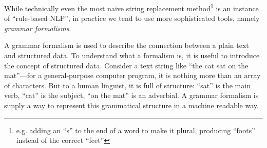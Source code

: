 While technically even the most naive string replacement method\footnote{e.g. adding an ``s'' to the end of a word to make it plural, producing ``foots'' instead of the correct ``feet''} is an instance of ``rule-based NLP'', in practice we tend to use more sophisticated tools, namely \emph{grammar formalisms}.

% 
% 
% 
% 
% 

A grammar formalism is used to describe the connection between a plain text and structured data. To understand what a formalism is, it is useful to introduce the concept of structured data. Consider a text string like ``the cat sat on the mat''—for a general-purpose computer program, it is nothing more than an array of characters. But to a human linguist, it is full of structure: ``sat'' is the main verb, ``cat'' is the subject, “on the mat” is an adverbial. A grammar formalism is simply a way to represent this grammatical structure in a machine readable way.




